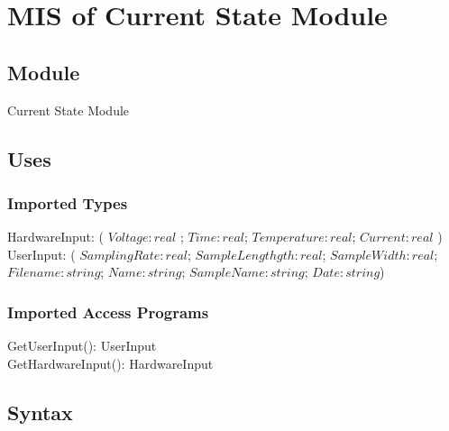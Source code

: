 \documentclass[12pt, titlepage]{article}
\begin{document}


\newpage
\section{MIS of Current State Module} \label{CS} 

\subsection{Module}

Current State Module

\subsection{Uses}

\subsubsection{Imported Types}

HardwareInput: ( $Voltage: real $ ; $Time: real$; $Temperature: real$; $Current: real$ )\\
UserInput: ( $SamplingRate: real$; $SampleLengthgth: real$; $SampleWidth: real$; $Filename: string$; $Name: string$; $SampleName: string$; $Date: string$)

\subsubsection{Imported Access Programs}

GetUserInput(): UserInput\\
GetHardwareInput(): HardwareInput\\ 


\subsection{Syntax}
\end{document}
